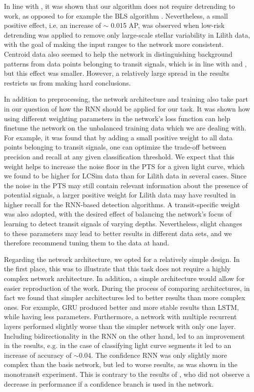 In line with \cite{pearson2018searching}, it was shown that our algorithm does not require detrending to work, as opposed to for example the BLS algorithm \cite{kovacs2002box}. Nevertheless, a small positive effect, i.e. an increase of $\sim$ 0.015 AP, was observed when low-risk detrending was applied to remove only large-scale stellar variability in Lilith data, with the goal of making the input ranges to the network more consistent. Centroid data also seemed to help the network in distinguishing background patterns from data points belonging to transit signals, which is in line with \cite{osborn2020rapid} and \cite{morvan2020detrending}, but this effect was smaller. However, a relatively large spread in the results restricts us from making hard conclusions.

In addition to preprocessing, the network architecture and training also take part in our question of how the RNN should be applied for our task. It was shown how using different weighting parameters in the network's loss function can help finetune the network on the unbalanced training data which we are dealing with. For example, it was found that by adding a small positive weight to all data points belonging to transit signals, one can optimize the trade-off between precision and recall at any given classification threshold. We expect that this weight helps to increase the noise floor in the PTS for a given light curve, which we found to be higher for LCSim data than for Lilith data in several cases. Since the noise in the PTS may still contain relevant information about the presence of potential signals, a larger positive weight for Lilith data may have resulted in higher recall for the RNN-based detection algorithms. A transit-specific weight was also adopted, with the desired effect of balancing the network's focus of learning to detect transit signals of varying depths. Nevertheless, slight changes to these parameters may lead to better results in different data sets, and we therefore recommend tuning them to the data at hand.

Regarding the network architecture, we opted for a relatively simple design. In the first place, this was to illustrate that this task does not require a highly complex network architecture. In addition, a simple architecture would allow for easier reproduction of the work. During the process of comparing architectures, in fact we found that simpler architectures led to better results than more complex ones. For example, GRU produced better and more stable results than LSTM, while having less parameters. Furthermore, a network with multiple recurrent layers performed slightly worse than the simpler network with only one layer. Including bidirectionality in the RNN on the other hand, led to an improvement in the results, e.g. in the case of classifying light curve segments it led to an increase of accuracy of $\sim$0.04. The confidence RNN was only slightly more complex than the basis network, but led to worse results, as was shown in the monotransit experiment. This is contrary to the results of \cite{devries2018learning}, who did not observe a decrease in performance if a confidence branch is used in the network.

